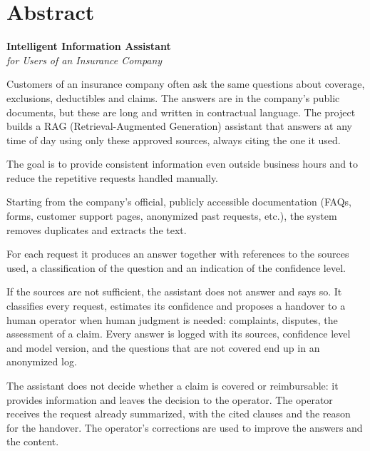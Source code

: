 \chapter*{Abstract}

\begin{center}
  {\Large\bfseries Intelligent Information Assistant}\\[0.3em]
  {\large\itshape for Users of an Insurance Company}
\end{center}
\vspace{0.5em}

\begingroup
\setlength{\parskip}{0.8em}

Customers of an insurance company often ask the same questions about coverage, exclusions,
deductibles and claims. The answers are in the company's public documents, but these are long
and written in contractual language. The project builds a RAG (Retrieval-Augmented Generation)
assistant that answers at any time of day using only these approved sources, always citing the
one it used.

The goal is to provide consistent information even outside business hours and to reduce the
repetitive requests handled manually.

Starting from the company's official, publicly accessible documentation (FAQs, forms, customer
support pages, anonymized past requests, etc.), the system removes duplicates and extracts the
text.

For each request it produces an answer together with references to the sources used,
a classification of the question and an indication of the confidence level.

If the sources are not sufficient, the assistant does not answer and says so. It classifies
every request, estimates its confidence and proposes a handover to a human operator when human
judgment is needed: complaints, disputes, the assessment of a claim. Every answer is logged with
its sources, confidence level and model version, and the questions that are not covered end up
in an anonymized log.

The assistant does not decide whether a claim is covered or reimbursable: it provides
information and leaves the decision to the operator. The operator receives the request already
summarized, with the cited clauses and the reason for the handover. The operator's corrections
are used to improve the answers and the content.
\par
\endgroup
